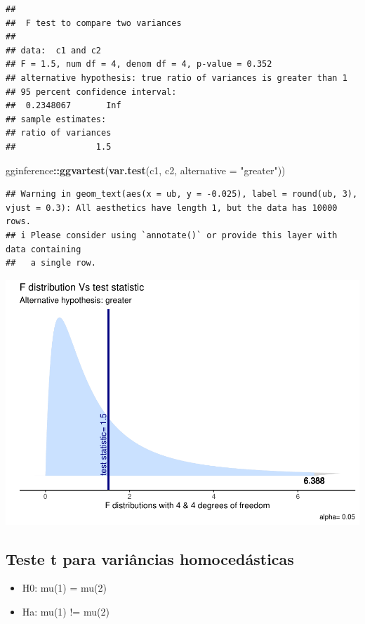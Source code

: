 \documentclass[
]{book}
\newenvironment{Shaded}{\begin{snugshade}}{\end{snugshade}}
\newcommand{\AttributeTok}[1]{\textcolor[rgb]{0.13,0.29,0.53}{#1}}
\newcommand{\FunctionTok}[1]{\textcolor[rgb]{0.13,0.29,0.53}{\textbf{#1}}}
\newcommand{\NormalTok}[1]{#1}
\newcommand{\SpecialCharTok}[1]{\textcolor[rgb]{0.81,0.36,0.00}{\textbf{#1}}}
\newcommand{\StringTok}[1]{\textcolor[rgb]{0.31,0.60,0.02}{#1}}
\providecommand{\tightlist}{%
  \setlength{\itemsep}{0pt}\setlength{\parskip}{0pt}}
\begin{document}
\begin{verbatim}
## 
##  F test to compare two variances
## 
## data:  c1 and c2
## F = 1.5, num df = 4, denom df = 4, p-value = 0.352
## alternative hypothesis: true ratio of variances is greater than 1
## 95 percent confidence interval:
##  0.2348067       Inf
## sample estimates:
## ratio of variances 
##                1.5
\end{verbatim}

\begin{Shaded}
\begin{Highlighting}[]
\NormalTok{gginference}\SpecialCharTok{::}\FunctionTok{ggvartest}\NormalTok{(}\FunctionTok{var.test}\NormalTok{(c1, c2, }\AttributeTok{alternative =} \StringTok{"greater"}\NormalTok{))}
\end{Highlighting}
\end{Shaded}

\begin{verbatim}
## Warning in geom_text(aes(x = ub, y = -0.025), label = round(ub, 3), vjust = 0.3): All aesthetics have length 1, but the data has 10000 rows.
## i Please consider using `annotate()` or provide this layer with data containing
##   a single row.
\end{verbatim}

\includegraphics{_main_files/figure-latex/vartest-1.pdf}

\subsection{Teste t para variâncias homocedásticas}\label{teste-t-para-variuxe2ncias-homoceduxe1sticas}

\begin{itemize}
\tightlist
\item
  H0: mu(1) = mu(2)
\item
  Ha: mu(1) != mu(2)
\end{itemize}
\end{document}
